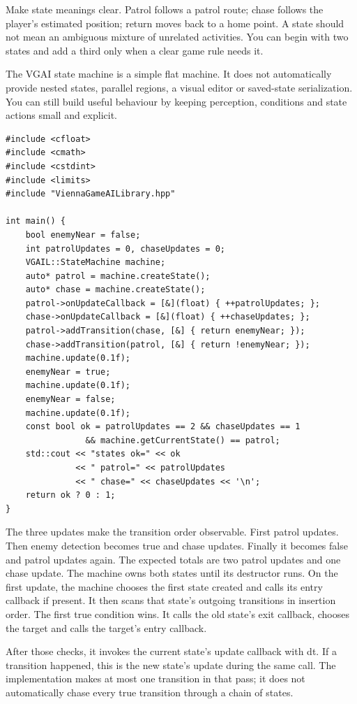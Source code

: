 \documentclass[11pt,a4paper]{article}
\begin{document}
Make state meanings clear. Patrol follows a patrol route; chase follows the player's estimated position; return moves back to a home point. A state should not mean an ambiguous mixture of unrelated activities. You can begin with two states and add a third only when a clear game rule needs it.

The VGAI state machine is a simple flat machine. It does not automatically provide nested states, parallel regions, a visual editor or saved-state serialization. You can still build useful behaviour by keeping perception, conditions and state actions small and explicit.
\begin{lstlisting}
#include <cfloat>
#include <cmath>
#include <cstdint>
#include <limits>
#include "ViennaGameAILibrary.hpp"

int main() {
    bool enemyNear = false;
    int patrolUpdates = 0, chaseUpdates = 0;
    VGAIL::StateMachine machine;
    auto* patrol = machine.createState();
    auto* chase = machine.createState();
    patrol->onUpdateCallback = [&](float) { ++patrolUpdates; };
    chase->onUpdateCallback = [&](float) { ++chaseUpdates; };
    patrol->addTransition(chase, [&] { return enemyNear; });
    chase->addTransition(patrol, [&] { return !enemyNear; });
    machine.update(0.1f);
    enemyNear = true;
    machine.update(0.1f);
    enemyNear = false;
    machine.update(0.1f);
    const bool ok = patrolUpdates == 2 && chaseUpdates == 1
                && machine.getCurrentState() == patrol;
    std::cout << "states ok=" << ok
              << " patrol=" << patrolUpdates
              << " chase=" << chaseUpdates << '\n';
    return ok ? 0 : 1;
}
\end{lstlisting}
The three updates make the transition order observable. First patrol updates. Then enemy detection becomes true and chase updates. Finally it becomes false and patrol updates again. The expected totals are two patrol updates and one chase update. The machine owns both states until its destructor runs.
On the first update, the machine chooses the first state created and calls its entry callback if present. It then scans that state's outgoing transitions in insertion order. The first true condition wins. It calls the old state's exit callback, chooses the target and calls the target's entry callback.

After those checks, it invokes the current state's update callback with dt. If a transition happened, this is the new state's update during the same call. The implementation makes at most one transition in that pass; it does not automatically chase every true transition through a chain of states.
\end{document}
